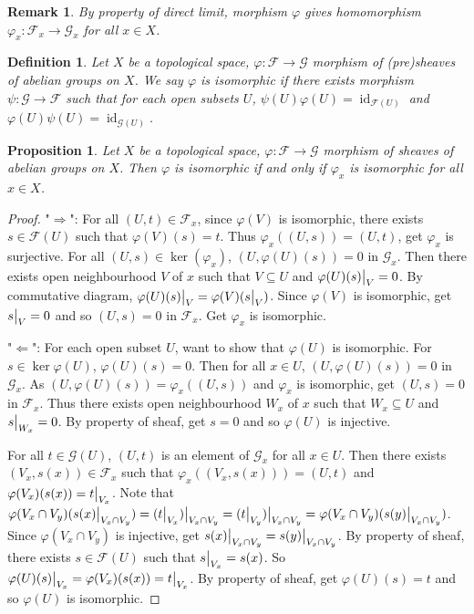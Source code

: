 \documentclass{ctexart}
\newtheorem{definition}{Definition}[section]
\newtheorem{remark}{Remark}[section]
\newtheorem{proposition}{Proposition}[section]
\newcommand{\identity}{\operatorname{id}}
\begin{document}
\begin{remark}
    By property of direct limit, morphism $\varphi$ gives homomorphism $\varphi_{x}: \mathcal{F}_{x} \longrightarrow \mathcal{G}_{x}$ for all $x\in X$.
\end{remark}
\begin{definition}
    Let $X$ be a topological space, $\varphi: \mathcal{F} \longrightarrow \mathcal{G}$ morphism of (pre)sheaves of abelian groups on $X$.
    We say $\varphi$ is isomorphic if there exists morphism $\psi: \mathcal{G} \longrightarrow \mathcal{F}$ such that for each open subsets $U$, 
    $\psi(U)\varphi(U) = \identity_{\mathcal{F}(U)}$ and $\varphi(U)\psi(U) = \identity_{\mathcal{G}(U)}$.
\end{definition}
\begin{proposition}
    Let $X$ be a topological space, $\varphi: \mathcal{F} \longrightarrow \mathcal{G}$ morphism of sheaves of abelian groups on $X$.
    Then $\varphi$ is isomorphic if and only if $\varphi_{x}$ is isomorphic for all $x\in X$.
    \label{Proposition 1.2}
\end{proposition}
\begin{proof}
    "$\Rightarrow$": For all $(U, t)\in \mathcal{F}_{x}$, since $\varphi(V)$ is isomorphic,
    there exists $s\in \mathcal{F}(U)$ such that $\varphi(V)(s) = t$.
    Thus $\varphi_{x}((U, s)) = (U, t)$, get $\varphi_{x}$ is surjective.
    For all $(U, s)\in \ker(\varphi_{x})$, $(U, \varphi(U)(s)) = 0$ in $\mathcal{G}_{x}$.
    Then there exists open neighbourhood $V$ of $x$ such that $V \subseteq U$ and $\varphi(U)(s)\big{|}_{V} = 0$.
    By commutative diagram, $\varphi(U)(s)\big{|}_{V} = \varphi(V)(s\big{|}_{V})$.
    Since $\varphi(V)$ is isomorphic, get $s\big{|}_{V} = 0$ and so $(U, s) = 0$ in $\mathcal{F}_{x}$.
    Get $\varphi_{x}$ is isomorphic.
    \par
    "$\Leftarrow$": For each open subset $U$, want to show that $\varphi(U)$ is isomorphic.
    For $s\in \ker{\varphi(U)}$, $\varphi(U)(s) = 0$.
    Then for all $x\in U$, $(U, \varphi(U)(s)) = 0$ in $\mathcal{G}_{x}$.
    As $(U, \varphi(U)(s)) = \varphi_{x}((U, s))$ and $\varphi_{x}$ is isomorphic, get $(U, s) = 0$ in $\mathcal{F}_{x}$.
    Thus there exists open neighbourhood $W_{x}$ of $x$ such that $W_{x} \subseteq U$ and $s\big{|}_{W_{x}} = 0$.
    By property of sheaf, get $s = 0$ and so $\varphi(U)$ is injective.
    \par
    For all $t\in \mathcal{G}(U)$, $(U, t)$ is an element of $\mathcal{G}_{x}$ for all $x\in U$.
    Then there exists $(V_{x}, s(x))\in \mathcal{F}_{x}$ such that $\varphi_{x}((V_{x}, s(x))) = (U, t)$ and $\varphi(V_{x})(s(x)) = t\big{|}_{V_{x}}$.
    Note that $\varphi(V_{x} \cap V_{y})(s(x)\big{|}_{V_{x} \cap V_{y}}) = (t\big{|}_{V_{x}})\big{|}_{V_{x} \cap V_{y}} = (t\big{|}_{V_{y}})\big{|}_{V_{x} \cap V_{y}} = \varphi(V_{x} \cap V_{y})(s(y)\big{|}_{V_{x} \cap V_{y}})$.
    Since $\varphi(V_{x} \cap V_{y})$ is injective, get $s(x)\big{|}_{V_{x} \cap V_{y}} = s(y)\big{|}_{V_{x} \cap V_{y}}$.
    By property of sheaf, there exists $s\in \mathcal{F}(U)$ such that $s\big{|}_{V_{x}} = s(x)$.
    So $\varphi(U)(s)\big{|}_{V_{x}} = \varphi(V_{x})(s(x)) = t\big{|}_{V_{x}}$.
    By property of sheaf, get $\varphi(U)(s) = t$ and so $\varphi(U)$ is isomorphic.
\end{proof}
\end{document}
